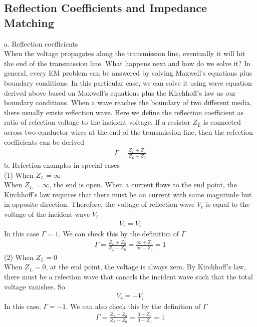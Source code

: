 \documentclass[a4paper]{article}
\begin{document}
\subsection{Reflection Coefficients and Impedance Matching}
{a. Reflection coefficients}\\
When the voltage propagates along the transmission line, eventually it will hit the end of the transmission line. What happens next and how do we solve it? In general, every EM problem can be answered by solving Maxwell's equations plus boundary conditions. In this particular case, we can solve it using wave equation derived above based on Maxwell's equations plus the Kirchhoff's law as our boundary conditions. When a wave reaches the boundary of two different media, there usually exists reflection wave. Here we define the reflection coefficient as ratio of refection voltage to the incident voltage. If a resistor $Z_L$ is connected across two conductor wires at the end of the transmission line, then the refection coefficients can be derived
\begin{align*}
	\Gamma = \frac{Z_L + Z_0}{Z_L - Z_0}
\end{align*}
{b. Refection examples in special cases}\\
(1) When $Z_L = \infty$\\
When $Z_L = \infty$, the end is open. When a current flows to the end point, the Kirchhoff's law requires that there must be an current with same magnitude but in opposite direction. Therefore, the voltage of reflection wave $V_r$ is equal to the voltage of the incident wave $V_i$
\begin{align*}
	V_r = V_i
\end{align*}
In this case $\Gamma = 1$. We can check this by the definition of $\Gamma$
\begin{align*}
	\Gamma = \frac{Z_L + Z_0}{Z_L - Z_0} = \frac{\infty + Z_0}{\infty - Z_0} = 1
\end{align*}
(2) When $Z_L = 0$\\
When $Z_L = 0$, at the end point, the voltage is always zero. By Kirchhoff's law, there must be a refection wave that cancels the incident wave such that the total voltage vanishes. So\\
\begin{align*}
	V_r = - V_i
\end{align*}
In this case, $\Gamma = -1$. We can also check this by the definition of $\Gamma$
\begin{align*}
	\Gamma = \frac{Z_L + Z_0}{Z_L - Z_0} = \frac{0 + Z_0}{0 - Z_0} = 1
\end{align*}
\end{document}

